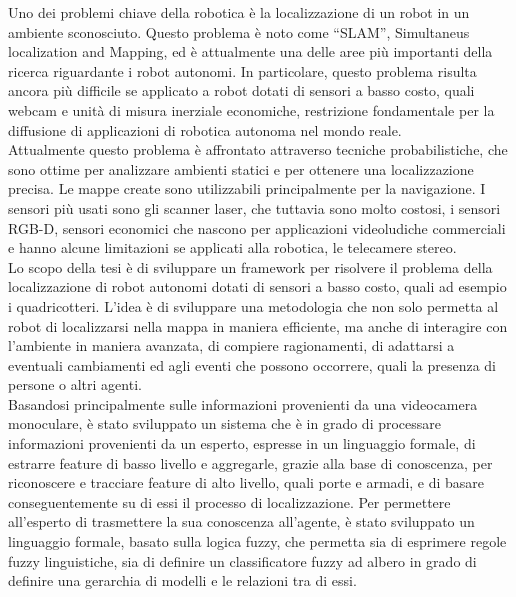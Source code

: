 Uno dei problemi chiave della robotica è la localizzazione di un robot in un ambiente sconosciuto. Questo problema è noto come ``SLAM'', Simultaneus localization and Mapping, ed è attualmente una delle aree più importanti della ricerca riguardante i robot autonomi. 
In particolare, questo problema risulta ancora più difficile se applicato a robot dotati di sensori a basso costo, quali webcam e unità di misura inerziale economiche, restrizione fondamentale per la diffusione di applicazioni di robotica autonoma nel mondo reale. \\
Attualmente questo problema è affrontato attraverso tecniche probabilistiche, che sono ottime per analizzare ambienti statici e per ottenere una localizzazione precisa. Le mappe create sono utilizzabili principalmente per la navigazione.
I sensori più usati sono gli scanner laser, che tuttavia sono molto costosi, i sensori RGB-D, sensori economici che nascono per applicazioni videoludiche commerciali e hanno alcune limitazioni se applicati alla robotica, le telecamere stereo. \\
Lo scopo della tesi è di sviluppare un framework per risolvere il problema della localizzazione di robot autonomi dotati di sensori a basso costo, quali ad esempio i quadricotteri. L'idea è di sviluppare una metodologia che non solo permetta al robot di localizzarsi nella mappa in maniera efficiente, ma anche di interagire con l'ambiente in maniera avanzata, di compiere ragionamenti, di adattarsi a eventuali cambiamenti ed agli eventi che possono occorrere, quali la presenza di persone o altri agenti. \\
Basandosi principalmente sulle informazioni provenienti da una videocamera monoculare, è stato sviluppato un sistema che è in grado di processare informazioni provenienti da un esperto, espresse in un linguaggio formale, di estrarre feature di basso livello e aggregarle, grazie alla base di conoscenza, per riconoscere e tracciare feature di alto livello, quali porte e armadi, e di basare conseguentemente su di essi il processo di localizzazione.
Per permettere all'esperto di trasmettere la sua conoscenza all'agente, è stato sviluppato un linguaggio formale, basato sulla logica fuzzy, che permetta sia di esprimere regole fuzzy linguistiche, sia di definire un classificatore fuzzy ad albero in grado di definire una gerarchia di modelli e le relazioni tra di essi. \\

